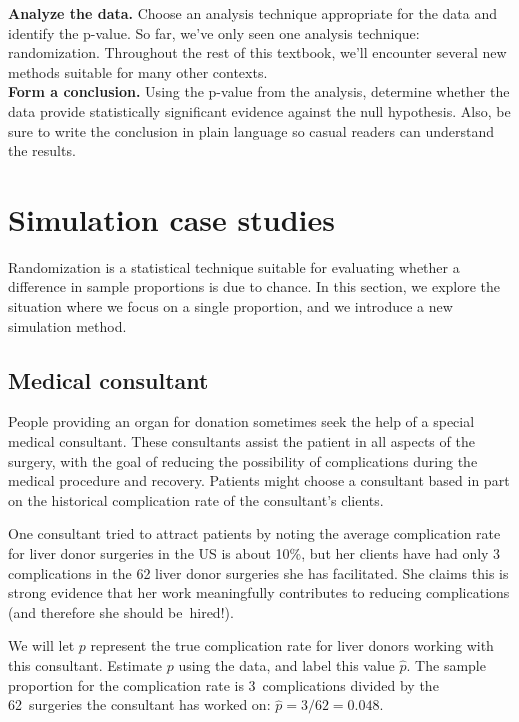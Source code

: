 \noindent\textbf{Analyze the data.} Choose an analysis technique appropriate for the data and identify the p-value. So far, we've only seen one analysis technique: randomization. Throughout the rest of this textbook, we'll encounter several new methods suitable for many other contexts. \\

\noindent\textbf{Form a conclusion.} Using the p-value from the analysis, determine whether the data provide statistically significant evidence against the null hypothesis. Also, be sure to write the conclusion in plain language so casual readers can understand the results.

\textPE{\newpage}


\section{Simulation case studies}
\label{SimulationCaseStudies}

Randomization is a statistical technique suitable for evaluating whether a difference in sample proportions is due to chance. In this section, we explore the situation where we focus on a single proportion, and we introduce a new simulation method.

\subsection{Medical consultant}

People providing an organ for donation sometimes seek the help of a special medical consultant. These consultants assist the patient in all aspects of the surgery, with the goal of reducing the possibility of complications during the medical procedure and recovery. Patients might choose a consultant based in part on the historical complication rate of the consultant's clients.

One consultant tried to attract patients by noting the average complication rate for liver donor surgeries in the US is about 10\%, but her clients have had only 3 complications in the 62 liver donor surgeries she has facilitated. She claims this is strong evidence that her work meaningfully contributes to reducing complications (and therefore she should be~hired!).

\begin{example}{We will let $p$ represent the true complication rate for liver donors working with this consultant. Estimate $p$ using the data, and label this value $\hat{p}$.}
The sample proportion for the complication rate is 3~complications divided by the 62~surgeries the consultant has worked on: $\hat{p} = 3/62 = 0.048$.
\end{example}

